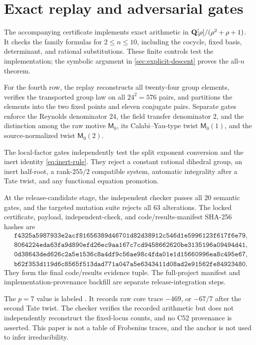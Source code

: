 \section{Exact replay and adversarial gates}
\label{sec:replay}

The accompanying certificate implements exact arithmetic in
\(\mathbf Q[\rho]/(\rho^2+\rho+1)\).  It checks the family formulas for
\(2\le n\le10\), including the cocycle, fixed basis, determinant, and
rational substitutions.  These finite controls test the implementation;
the symbolic argument in \cref{sec:explicit-descent} proves the
all-\(n\) theorem.

For the fourth row, the replay reconstructs all twenty-four group
elements, verifies the transported group law on all \(24^2=576\) pairs,
and partitions the elements into the two fixed points and eleven conjugate
pairs.  Separate gates enforce the Reynolds denominator \(24\), the field
transfer denominator \(2\), and the distinction among the raw motive
\(\mathsf M_0\), its Calabi--Yau-type twist \(\mathsf M_0(1)\), and the
source-normalized twist \(\mathsf M_0(2)\).

The local-factor gates independently test the split exponent conversion
and the inert identity \eqref{eq:inert-rule}.  They reject a constant
rational dihedral group, an inert half-root, a rank-\(255/2\) compatible
system, automatic integrality after a Tate twist, and any functional
equation promotion.

At the release-candidate stage, the independent checker passes all \(20\)
semantic gates, and the targeted mutation suite rejects all \(63\)
alterations.  The locked certificate, payload, independent-check, and
code/results-manifest SHA-256 hashes are
\[
\begin{split}
&\texttt{f4325a5987933e2acf81656389d46701d82d38912c546d1e5996123f617f6e79},\\
&\texttt{8064224eda63fa9d890efd26ec9aa167c7cd9458662620be3135196a09494d41},\\
&\texttt{0d38643ded626c2a5e1536c8a4df9c56ae98c4fda01e1d15660996ea8c495e67},\\
&\texttt{b62f353d119d6c8565f513dad771a047a5e6343411d08ad2e91562fe84923480}.
\end{split}
\]
They form the final code/results evidence tuple.  The full-project manifest
and implementation-provenance backfill are separate release-integration
steps.

The \(p=7\) value is labeled
.
It records raw core trace \(-469\), or \(-67/7\) after the second Tate
twist.  The checker verifies the recorded arithmetic but does not
independently reconstruct the fixed-locus counts, and no C52 provenance is
asserted.  This paper is not a table of Frobenius traces, and the anchor is
not used to infer irreducibility.
